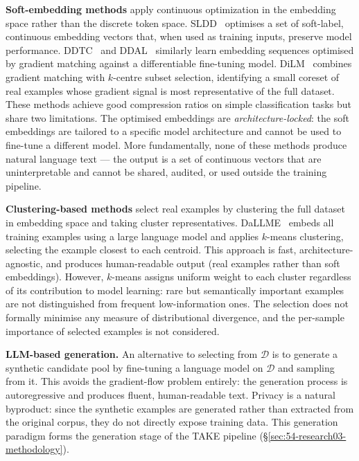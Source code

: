 \begin{foldable}
  \textbf{Soft-embedding methods} apply continuous optimization in the embedding space rather than the discrete token space.
  SLDD~\cite{sucholutsky2021soft} optimises a set of soft-label, continuous embedding vectors that, when used as training inputs, preserve model performance.
  DDTC~\cite{li2021data} and DDAL~\cite{maekawa2023dataset} similarly learn embedding sequences optimised by gradient matching against a differentiable fine-tuning model.
  DiLM~\cite{maekawa2024dilm} combines gradient matching with $k$-centre subset selection, identifying a small coreset of real examples whose gradient signal is most representative of the full dataset.
  These methods achieve good compression ratios on simple classification tasks but share two limitations.
  The optimised embeddings are \emph{architecture-locked}: the soft embeddings are tailored to a specific model architecture and cannot be used to fine-tune a different model.
  More fundamentally, none of these methods produce natural language text --- the output is a set of continuous vectors that are uninterpretable and cannot be shared, audited, or used outside the training pipeline.
\end{foldable}

\begin{foldable}
  \textbf{Clustering-based methods} select real examples by clustering the full dataset in embedding space and taking cluster representatives.
  DaLLME~\cite{tao2024textual} embeds all training examples using a large language model and applies $k$-means clustering, selecting the example closest to each centroid.
  This approach is fast, architecture-agnostic, and produces human-readable output (real examples rather than soft embeddings).
  However, $k$-means assigns uniform weight to each cluster regardless of its contribution to model learning: rare but semantically important examples are not distinguished from frequent low-information ones.
  The selection does not formally minimise any measure of distributional divergence, and the per-sample importance of selected examples is not considered.
\end{foldable}

\begin{foldable}
  \textbf{LLM-based generation.}
  An alternative to selecting from $\mathcal{D}$ is to generate a synthetic candidate pool by fine-tuning a language model on $\mathcal{D}$ and sampling from it.
  This avoids the gradient-flow problem entirely: the generation process is autoregressive and produces fluent, human-readable text.
  Privacy is a natural byproduct: since the synthetic examples are generated rather than extracted from the original corpus, they do not directly expose training data.
  This generation paradigm forms the generation stage of the TAKE pipeline (\S\ref{sec:54-research03-methodology}).
\end{foldable}

